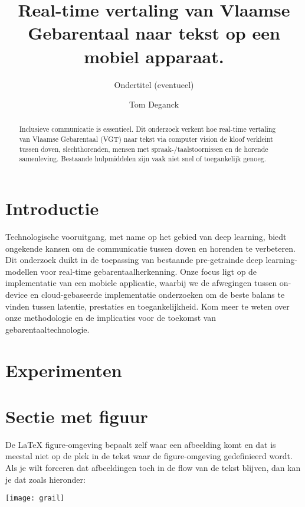 \documentclass[a0,portrait]{hogent-poster}
\title{Real-time vertaling van Vlaamse Gebarentaal naar tekst op een mobiel apparaat.}
\subtitle{Ondertitel (eventueel)}
\author{Tom Deganck}
\begin{document}
\maketitle

\begin{abstract}
Inclusieve communicatie is essentieel.
Dit onderzoek verkent hoe real-time vertaling van Vlaamse Gebarentaal (VGT) naar tekst via computer vision de kloof verkleint tussen doven, slechthorenden, mensen met spraak-/taalstoornissen en de horende samenleving. 
Bestaande hulpmiddelen zijn vaak niet snel of toegankelijk genoeg.
\end{abstract}

\begin{multicols}{2} %

\section{Introductie}

Technologische vooruitgang, met name op het gebied van deep learning, biedt ongekende kansen om de communicatie tussen doven en horenden te verbeteren. 
Dit onderzoek duikt in de toepassing van bestaande pre-getrainde deep learning-modellen voor real-time gebarentaalherkenning. 
Onze focus ligt op de implementatie van een mobiele applicatie, waarbij we de afwegingen tussen on-device en cloud-gebaseerde implementatie onderzoeken om de beste balans te vinden tussen latentie, prestaties en toegankelijkheid. 
Kom meer te weten over onze methodologie en de implicaties voor de toekomst van gebarentaaltechnologie.

\section{Experimenten}


\section{Sectie met figuur}

De {\LaTeX} figure-omgeving bepaalt zelf waar een afbeelding komt en dat is meestal niet op de plek in de tekst waar de figure-omgeving gedefinieerd wordt. Als je wilt forceren dat afbeeldingen toch in de flow van de tekst blijven, dan kan je dat zoals hieronder:

\begin{center}
  \captionsetup{type=figure}
  \texttt{[image: grail]}
\end{center}


\end{multicols}
\end{document}
